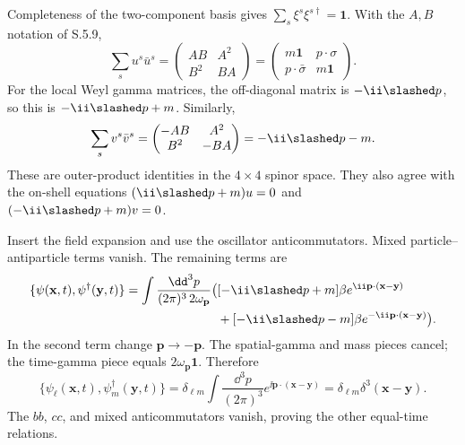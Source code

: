 \begin{enumerate}
Completeness of the two-component basis gives
\(\sum_s\xi^s\xi^{s\dagger}=\mathbf1\).  With the \(A,B\) notation of
S.5.9,
\[
\sum_su^s\bar u^s
=\begin{pmatrix}AB&A^2\\B^2&BA\end{pmatrix}
=\begin{pmatrix}
m\mathbf1&p\cdot\sigma\\
p\cdot\bar\sigma&m\mathbf1
\end{pmatrix}.
\]
For the local Weyl gamma matrices, the off-diagonal matrix is
\(-\ii\slashed p\), so this is \(-\ii\slashed p+m\).  Similarly,
\[
\sum_sv^s\bar v^s
=\begin{pmatrix}-AB&A^2\\B^2&-BA\end{pmatrix}
=-\ii\slashed p-m.
\]
These are outer-product identities in the \(4\times4\) spinor space.
They also agree with the on-shell equations
\((\ii\slashed p+m)u=0\) and \((-\ii\slashed p+m)v=0\).

Insert the field expansion and use the oscillator anticommutators.  Mixed
particle--antiparticle terms vanish.  The remaining terms are
\[
\begin{split}
 \{\psi(\mathbf x,t),\psi^\dagger(\mathbf y,t)\}
 =\int\frac{\dd^3p}{(2\pi)^3\,2\omega_{\mathbf p}}
 \bigl(&[-\ii\slashed p+m]\beta e^{\ii\mathbf p\cdot(\mathbf x-\mathbf y)}
 \\
 &+[-\ii\slashed p-m]\beta e^{-\ii\mathbf p\cdot(\mathbf x-\mathbf y)}
 \bigr).
\end{split}
\]
In the second term change \(\mathbf p\to-\mathbf p\).  The spatial-gamma
and mass pieces cancel; the time-gamma piece equals
\(2\omega_{\mathbf p}\mathbf{1}\).  Therefore
\[
 \{\psi_\ell(\mathbf x,t),\psi_m^\dagger(\mathbf y,t)\}
 =\delta_{\ell m}\int\frac{\dd^3p}{(2\pi)^3}
 e^{\ii\mathbf p\cdot(\mathbf x-\mathbf y)}
 =\delta_{\ell m}\delta^3(\mathbf x-\mathbf y).
\]
The \(bb\), \(cc\), and mixed anticommutators vanish, proving the other
equal-time relations.


\end{enumerate}
